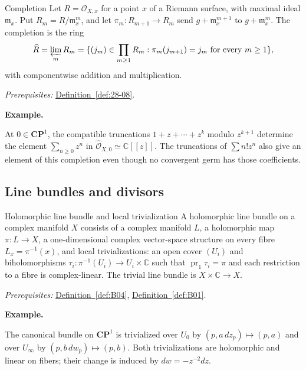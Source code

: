 \documentclass[11pt]{article}
\makeatletter
\newcommand{\C}{\mathbb C}
\newcounter{definition}
\newcommand{\CP}{\mathbf{CP}}
\newcommand{\exampleheading}{\par\medskip\textbf{Example.}\par\smallskip}
\newcommand{\currentdefinition}[1]{\protected@edef\@currentlabel{#1}}
\makeatother
\begin{document}
\begin{definitionbox}{Completion}
\currentdefinition{\thedefinition}
\label{def:28-10}
Let $R=\mathcal O_{X,x}$ for a point $x$ of a Riemann surface, with maximal ideal $\mathfrak m_x$. Put $R_m=R/\mathfrak m_x^m$, and let $\pi_m:R_{m+1}\to R_m$ send $g+\mathfrak m_x^{m+1}$ to $g+\mathfrak m_x^m$. The completion is the ring
\[\widehat R=\varprojlim_m R_m=\{(j_m)\in\prod_{m\ge1}R_m:\pi_m(j_{m+1})=j_m\text{ for every }m\ge1\},\]
with componentwise addition and multiplication.

\smallskip
\textit{Prerequisites:} \hyperref[def:28-08]{Definition~\ref*{def:28-08}}.

\exampleheading
At $0\in\CP^1$, the compatible truncations $1+z+\cdots+z^k$ modulo $z^{k+1}$ determine the element $\sum_{n\ge0}z^n$ in $\widehat{\mathcal O}_{X,0}\simeq\C[[z]]$. The truncations of $\sum n!z^n$ also give an element of this completion even though no convergent germ has those coefficients.
\end{definitionbox}

\subsection*{Line bundles and divisors}

\begin{definitionbox}{Holomorphic line bundle and local trivialization}
\currentdefinition{\thedefinition}
\label{def:N08}
A holomorphic line bundle on a complex manifold $X$ consists of a complex manifold $L$, a holomorphic map $\pi:L\to X$, a one-dimensional complex vector-space structure on every fibre $L_x=\pi^{-1}(x)$, and local trivializations: an open cover $(U_i)$ and biholomorphisms $\tau_i:\pi^{-1}(U_i)\to U_i\times\C$ such that $\operatorname{pr}_1\tau_i=\pi$ and each restriction to a fibre is complex-linear. The trivial line bundle is $X\times\C\to X$.

\smallskip
\textit{Prerequisites:} \hyperref[def:B04]{Definition~\ref*{def:B04}}, \hyperref[def:B01]{Definition~\ref*{def:B01}}.

\exampleheading
The canonical bundle on $\CP^1$ is trivialized over $U_0$ by $(p,a\,dz_p)\mapsto(p,a)$ and over $U_\infty$ by $(p,b\,dw_p)\mapsto(p,b)$. Both trivializations are holomorphic and linear on fibers; their change is induced by $dw=-z^{-2}dz$.
\end{definitionbox}
\end{document}
